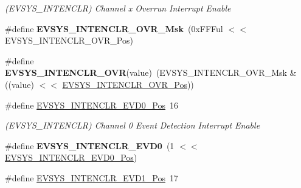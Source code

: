 \begin{DoxyCompactItemize}
\begin{DoxyCompactList}\small\item\em (E\+V\+S\+Y\+S\+\_\+\+I\+N\+T\+E\+N\+C\+L\+R) Channel x Overrun Interrupt Enable \end{DoxyCompactList}\item 
\hypertarget{group___s_a_m_l21___e_v_s_y_s_ga8b07d636b3cc0fed1db4c969ca9eec79}{}\#define {\bfseries E\+V\+S\+Y\+S\+\_\+\+I\+N\+T\+E\+N\+C\+L\+R\+\_\+\+O\+V\+R\+\_\+\+Msk}~(0x\+F\+F\+Ful $<$$<$ E\+V\+S\+Y\+S\+\_\+\+I\+N\+T\+E\+N\+C\+L\+R\+\_\+\+O\+V\+R\+\_\+\+Pos)\label{group___s_a_m_l21___e_v_s_y_s_ga8b07d636b3cc0fed1db4c969ca9eec79}

\item 
\hypertarget{group___s_a_m_l21___e_v_s_y_s_gaac35c26da6b2d918540a611f6f3a2f65}{}\#define {\bfseries E\+V\+S\+Y\+S\+\_\+\+I\+N\+T\+E\+N\+C\+L\+R\+\_\+\+O\+V\+R}(value)~(E\+V\+S\+Y\+S\+\_\+\+I\+N\+T\+E\+N\+C\+L\+R\+\_\+\+O\+V\+R\+\_\+\+Msk \& ((value) $<$$<$ \hyperlink{group___s_a_m_l21___e_v_s_y_s_gafee2a545114cf715716165d6590ac9cc}{E\+V\+S\+Y\+S\+\_\+\+I\+N\+T\+E\+N\+C\+L\+R\+\_\+\+O\+V\+R\+\_\+\+Pos}))\label{group___s_a_m_l21___e_v_s_y_s_gaac35c26da6b2d918540a611f6f3a2f65}

\item 
\hypertarget{group___s_a_m_l21___e_v_s_y_s_ga3ba80aa7fc515424670c352a69f6ffa7}{}\#define \hyperlink{group___s_a_m_l21___e_v_s_y_s_ga3ba80aa7fc515424670c352a69f6ffa7}{E\+V\+S\+Y\+S\+\_\+\+I\+N\+T\+E\+N\+C\+L\+R\+\_\+\+E\+V\+D0\+\_\+\+Pos}~16\label{group___s_a_m_l21___e_v_s_y_s_ga3ba80aa7fc515424670c352a69f6ffa7}

\begin{DoxyCompactList}\small\item\em (E\+V\+S\+Y\+S\+\_\+\+I\+N\+T\+E\+N\+C\+L\+R) Channel 0 Event Detection Interrupt Enable \end{DoxyCompactList}\item 
\hypertarget{group___s_a_m_l21___e_v_s_y_s_gabafb6938bb647b456d9ab61686113d50}{}\#define {\bfseries E\+V\+S\+Y\+S\+\_\+\+I\+N\+T\+E\+N\+C\+L\+R\+\_\+\+E\+V\+D0}~(1 $<$$<$ \hyperlink{group___s_a_m_l21___e_v_s_y_s_ga3ba80aa7fc515424670c352a69f6ffa7}{E\+V\+S\+Y\+S\+\_\+\+I\+N\+T\+E\+N\+C\+L\+R\+\_\+\+E\+V\+D0\+\_\+\+Pos})\label{group___s_a_m_l21___e_v_s_y_s_gabafb6938bb647b456d9ab61686113d50}

\item 
\hypertarget{group___s_a_m_l21___e_v_s_y_s_gabd12d170f66f38972e54314834495117}{}\#define \hyperlink{group___s_a_m_l21___e_v_s_y_s_gabd12d170f66f38972e54314834495117}{E\+V\+S\+Y\+S\+\_\+\+I\+N\+T\+E\+N\+C\+L\+R\+\_\+\+E\+V\+D1\+\_\+\+Pos}~17\label{group___s_a_m_l21___e_v_s_y_s_gabd12d170f66f38972e54314834495117}


\end{DoxyCompactItemize}
